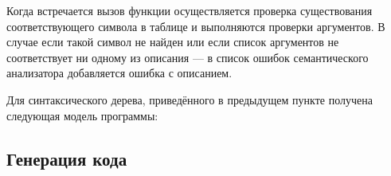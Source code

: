     Когда встречается вызов функции осуществляется проверка существования соответствующего символа в таблице и выполняются проверки аргументов.
    В случае если такой символ не найден или если список аргументов не соответствует ни одному из описания --- в список ошибок семантического анализатора добавляется ошибка с описанием.

    Для синтаксического дерева, приведённого в предыдущем пункте получена следующая модель программы:
    
    
    
    \subsection{Генерация кода}
    

